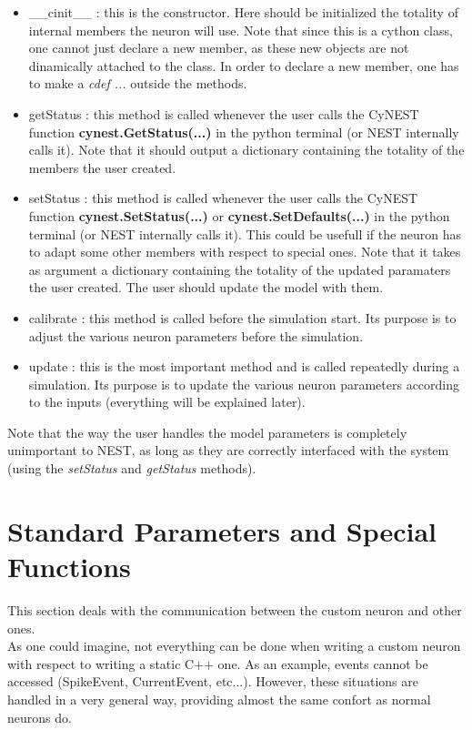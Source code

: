 \documentclass{article}
\begin{document}
\begin{itemize}
\item \_\_cinit\_\_ : this is the constructor. Here should be initialized the totality of internal members the neuron will use. Note that since this is a cython class, one cannot just declare a new member, as these new objects are not dinamically attached to the class. In order to declare a new member, one has to make a \emph{cdef ...} outside the methods. 
\item getStatus : this method is called whenever the user calls the CyNEST function \textbf{ cynest.GetStatus(...)} in the python terminal (or NEST internally calls it). Note that it should output a dictionary containing the totality of the members the user created.
\item setStatus : this method is called whenever the user calls the CyNEST function \textbf{ cynest.SetStatus(...)} or \textbf{cynest.SetDefaults(...)} in the python terminal (or NEST internally calls it). This could be usefull if the neuron has to adapt some other members with respect to special ones. Note that it takes as argument a dictionary containing the totality of the updated paramaters the user created. The user should update the model with them.
\item calibrate : this method is called before the simulation start. Its purpose is to adjust the various neuron parameters before the simulation.
\item update : this is the most important method and is called repeatedly during a simulation. Its purpose is to update the various neuron parameters according to the inputs (everything will be explained later).
\end{itemize}
Note that the way the user handles the model parameters is completely unimportant to NEST, as long as they are correctly interfaced with the system (using the \emph{setStatus} and \emph{getStatus} methods).



\section{Standard Parameters and Special Functions}
This section deals with the communication between the custom neuron and other ones.\\
As one could imagine, not everything can be done when writing a custom neuron with respect to writing a static C++ one. As an example, events cannot be accessed (SpikeEvent, CurrentEvent, etc...). However, these situations are handled in a very general way, providing almost the same confort as normal neurons do.
\end{document}
